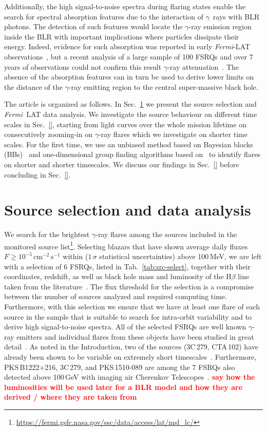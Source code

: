 \documentclass[twocolumn]{aastex62}
\newcommand{\Grays}{$\gamma$~rays\xspace}
\newcommand{\gray}{$\gamma$-ray\xspace}
\newcommand{\FermiLAT}{\emph{Fermi}~LAT\xspace}
\newcommand{\fermiLAT}{\emph{Fermi}-LAT\xspace}
\newcommand{\todo}[1]{\textbf{\textcolor{red}{#1}}}
\begin{document}
Additionally, the high signal-to-noise spectra during flaring states enable the search for spectral absorption features due to the interaction of \Grays with BLR photons.
The detection of such features would locate the \gray emission region inside the BLR with important implications where particles dissipate their energy. 
Indeed, evidence for such absorption was reported in early  \fermiLAT observations~\citep{2010ApJ...717L.118P}, but a recent analysis of a large sample of 100 FSRQs and over 7\,years of observations could not confirm this result \gray attenuation~\citep{2018MNRAS.477.4749C}.
The absence of the absorption features can in turn be used to derive lower limits on the distance of the \gray emitting region to the central super-massive black hole. 

The article is organized as follows. 
In Sec.~\ref{sec:data} we present the source selection and \FermiLAT data analysis. 
We investigate the source behaviour on different time scales in Sec.~\ref{}, starting from light curves over the whole mission lifetime on consecutively zooming-in on \gray flares which we investigate on shorter time scales. 
For the first time, we use an unbiased method based on Bayesian blocks (BBs)~\citep{2013ApJ...764..167S} and one-dimensional group finding algorithms based on~\citet{1998ApJ...498..137E} to identify flares on shorter and shorter timescales.  
We discuss our findings in Sec.~\ref{}
before concluding in Sec.~\ref{}.

\section{Source selection and data analysis}
\label{sec:data}

We search for the brightest \gray flares among the sources included in the monitored source list\footnote{\url{https://fermi.gsfc.nasa.gov/ssc/data/access/lat/msl_lc/}}. 
Selecting blazars that have shown average daily fluxes $F \geqslant 10^{-5}\,\mathrm{cm}^{-2}\,\mathrm{s}^{-1}$ within ($1\,\sigma$ statistical uncertainties) above 100\,MeV,
we are left with a selection of 6 FSRQs, listed in Tab.~\ref{tab:src-select}, together with their coordinates, redshift, as well as black hole mass and luminosity of the $\mathrm{H}\beta$ line taken from the literature~\cite{}.  
The flux threshold for the selection is a compromise between the number of sources analyzed and required computing time. Furthermore, with this selection we ensure that we have at least one flare of each source in the sample that is suitable to search for intra-orbit variability and to derive high signal-to-noise spectra. 
All of the selected FSRQs are well known \gray emitters and individual flares from these objects have been studied in great detail~\citep[e.g.,][]{}. 
As noted in the Introduction, two of the sources (3C\,279, CTA\,102) have already been shown to be variable on extremely short timescales~\citep{TheFermi-LAT:2016dss,2018ApJ...854L..26S}. 
Furthermore, PKS\,B1222+216, 3C\,279, and PKS\,1510-089  are among the 7 FSRQs also detected above 100\,GeV with imaging air Cherenkov Telescopes~\citep{}. 
\todo{say how the luminosities will be used later for a BLR model and how they are derived / where they are taken from}
\end{document}
